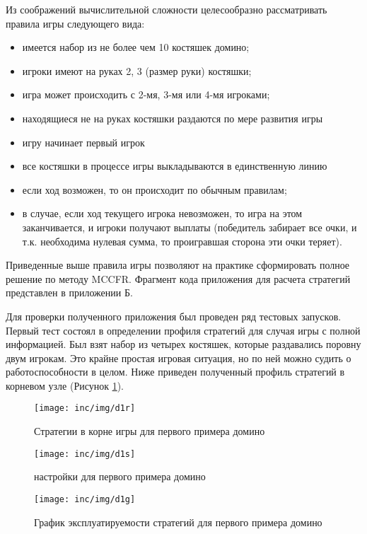 Из соображений вычислительной сложности целесообразно рассматривать правила игры следующего вида:
\begin{itemize}	
\item имеется набор из не более чем 10 костяшек домино;
\item игроки имеют на руках 2, 3 (размер руки) костяшки;
\item игра может происходить с 2-мя, 3-мя или 4-мя игроками;
\item находящиеся не на руках костяшки раздаются по мере развития игры
\item игру начинает первый игрок
\item все костяшки в процессе игры выкладываются в единственную линию
\item если ход возможен, то он происходит по обычным правилам;
\item в случае, если ход текущего игрока невозможен, то игра на этом заканчивается, и игроки получают выплаты (победитель забирает все очки, и т.к. необходима нулевая сумма, то проигравшая сторона эти очки теряет).
\end{itemize}
\par
Приведенные выше правила игры позволяют на практике сформировать полное решение по методу MCCFR. Фрагмент кода приложения для расчета стратегий представлен в приложении Б.
\par
Для проверки полученного приложения был проведен ряд тестовых запусков. Первый тест состоял в определении профиля стратегий для случая игры с полной информацией. Был взят набор из четырех костяшек, которые раздавались поровну двум игрокам. Это крайне простая игровая ситуация, но по ней можно судить о работоспособности в целом. Ниже приведен полученный профиль стратегий в корневом узле (Рисунок \ref{fig:figd1r}).
\begin{figure}[H]
	\centering
	\texttt{[image: inc/img/d1r]}
	\caption{Стратегии в корне игры для первого примера домино}
	\label{fig:figd1r}
\end{figure}
\begin{figure}[H]
	\centering
	\texttt{[image: inc/img/d1s]}
	\caption{настройки для первого примера домино}
	\label{fig:figd1s}
\end{figure}
\begin{figure}[H]
	\centering
	\texttt{[image: inc/img/d1g]}
	\caption{График эксплуатируемости стратегий для первого примера домино}
	\label{fig:figd1g}
\end{figure}
